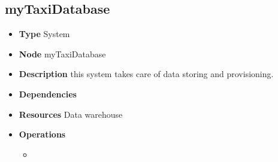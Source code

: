 \subsection{myTaxiDatabase}
\begin{itemize}
	\item[]\textbf{Type} System
	\item[]\textbf{Node} myTaxiDatabase
	\item[]\textbf{Description}  this system takes care of data storing and provisioning.
	\item[]\textbf{Dependencies}
	\item[]\textbf{Resources} Data warehouse
	\item[]\textbf{Operations}\begin{itemize}
		\item
	\end{itemize}
\end{itemize}